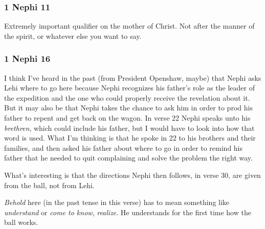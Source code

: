 	\subsubsection{1 Nephi 11} %
	
		\begin{compactdesc}
		
		\item[18$\vert$]
		\begin{compactdesc}
		\item[after the manner of the flesh] Extremely important qualifier on the mother of Christ. Not after the manner of the spirit, or whatever else you want to say.
		\end{compactdesc}
		
		\end{compactdesc}

	\subsubsection{1 Nephi 16} %

		\begin{compactdesc}

		\item[23$\vert$]
		\begin{compactdesc}
		\item[Asking Lehi where to go] I think I've heard in the past (from President Openshaw, maybe) that Nephi asks Lehi where to go here because Nephi recognizes his father's role as the leader of the expedition and the one who could properly receive the revelation about it. But it may also be that Nephi takes the chance to ask him in order to prod his father to repent and get back on the wagon. In verse 22 Nephi speaks unto his \textit{brethren}, which could include his father, but I would have to look into how that word is used. What I'm thinking is that he spoke in 22 to his brothers and their families, and then asked his father about where to go in order to remind his father that he needed to quit complaining and solve the problem the right way.

		What's interesting is that the directions Nephi then follows, in verse 30, are given from the ball, not from Lehi.
		\end{compactdesc}

		\item[23$\vert$]
		\begin{compactdesc}
		\item[beheld] \textit{Behold} here (in the past tense in this verse) has to mean something like \textit{understand} or \textit{come to know}, \textit{realize}. He understands for the first time how the ball works.
		\end{compactdesc}

		\end{compactdesc}

